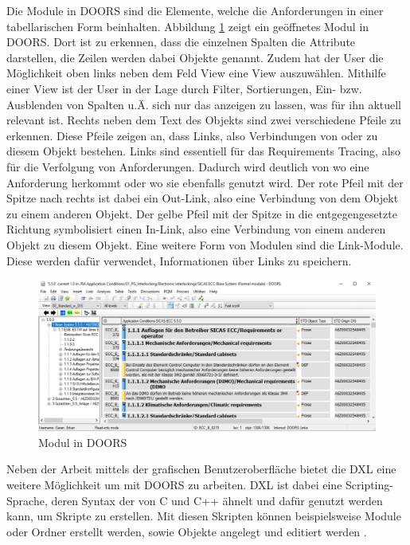 Die Module in \acs{DOORS} sind die Elemente, welche die Anforderungen in einer tabellarischen Form beinhalten. Abbildung \ref*{fig:Doors Modul} zeigt ein geöffnetes Modul in \acs{DOORS}. Dort ist zu erkennen,
dass die einzelnen Spalten die Attribute darstellen, die Zeilen werden dabei Objekte genannt. Zudem hat der User die Möglichkeit oben links neben dem Feld \glqq View\grqq{} eine View auszuwählen. Mithilfe einer View 
ist der User in der Lage durch Filter, Sortierungen, Ein- bzw. Ausblenden von Spalten u.Ä. sich nur das anzeigen zu lassen, was für ihn aktuell relevant ist. Rechts neben dem Text des Objekts sind 
zwei verschiedene Pfeile zu erkennen. Diese Pfeile zeigen an, dass Links, also Verbindungen von oder zu diesem Objekt bestehen. Links sind essentiell für das Requirements Tracing, also für die
Verfolgung von Anforderungen. Dadurch wird deutlich von wo eine Anforderung herkommt oder wo sie ebenfalls genutzt wird. Der rote Pfeil mit der Spitze nach rechts ist dabei ein Out-Link, also eine
Verbindung von dem Objekt zu einem anderen Objekt. Der gelbe Pfeil mit der Spitze in die entgegengesetzte Richtung symbolisiert einen In-Link, also eine Verbindung von einem anderen Objekt zu diesem 
Objekt. Eine weitere Form von Modulen sind die Link-Module. Diese werden dafür verwendet, Informationen über Links zu speichern. 

\begin{figure}[H]
    \centering
    \includegraphics[width = \textwidth]{abbildungen/Modul in Doors.PNG}
    \caption{Modul in \acs{DOORS}}
    \label{fig:Doors Modul}
\end{figure}

Neben der Arbeit mittels der grafischen Benutzeroberfläche bietet die \ac*{DXL} eine weitere Möglichkeit um mit \acs{DOORS} zu arbeiten. \acs{DXL} ist dabei eine Scripting-Sprache, deren
Syntax der von C und C++ ähnelt und dafür genutzt werden kann, um Skripte zu erstellen. Mit diesen Skripten können beispielsweise Module oder Ordner erstellt werden, sowie Objekte angelegt und 
editiert werden \cite[]{q7}. 